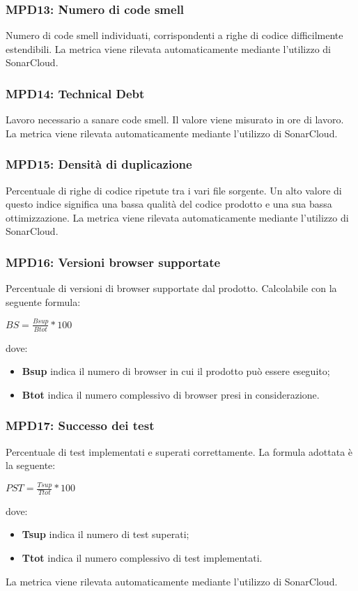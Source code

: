 \subsubsection{MPD13: Numero di code smell}
Numero di code smell individuati, corrispondenti a righe di codice difficilmente estendibili.
La metrica viene rilevata automaticamente mediante l’utilizzo di {SonarCloud}\glo.

\subsubsection{MPD14: Technical Debt}
Lavoro necessario a sanare code smell. Il valore viene misurato in ore di lavoro.
La metrica viene rilevata automaticamente mediante l’utilizzo di {SonarCloud}\glo.

\subsubsection{MPD15: Densità di duplicazione}
Percentuale di righe di codice ripetute tra i vari file sorgente.
Un alto valore di questo indice significa una bassa qualità del codice prodotto e una sua bassa ottimizzazione.
La metrica viene rilevata automaticamente mediante l’utilizzo di {SonarCloud}\glo.

\subsubsection{MPD16: Versioni browser supportate}
Percentuale di versioni di browser supportate dal prodotto.
Calcolabile con la seguente formula:
\begin{center}
    $BS = \displaystyle \frac{Bsup}{Btot}*100$
\end{center}
dove:
\begin{itemize}
    \item \textbf{Bsup} indica il numero di browser in cui il prodotto può essere eseguito;
    \item \textbf{Btot} indica il numero complessivo di browser presi in considerazione.
\end{itemize}

\subsubsection{MPD17: Successo dei test}
Percentuale di test implementati e superati correttamente.
La formula adottata è la seguente:
\begin{center}
    $PST = \displaystyle \frac{Tsup}{Ttot}*100$
\end{center}
dove:
\begin{itemize}
    \item \textbf{Tsup} indica il numero di test superati;
    \item \textbf{Ttot} indica il numero complessivo di test implementati.
\end{itemize}
La metrica viene rilevata automaticamente mediante l’utilizzo di {SonarCloud}\glo.

